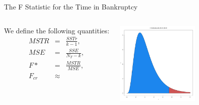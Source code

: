 \begin{frame}{The F Statistic for the Time in Bankruptcy}

  \begin{columns}

    We define the following quantities:
    \begin{eqnarray*}
      MSTR  & = & \frac{SSTr}{k-1}, \\
      MSE   & = & \frac{SSE}{N_T - k}, \\
      F*    & = & \frac{MSTR}{MSE}, \\
      F_{cr} & \approx &
    \end{eqnarray*}

    \vfill


    \vfill

    \centerline{\includegraphics[width=4cm]{img/FDistribution}}

    \vfill

    \end{columns}

  
\end{frame}



